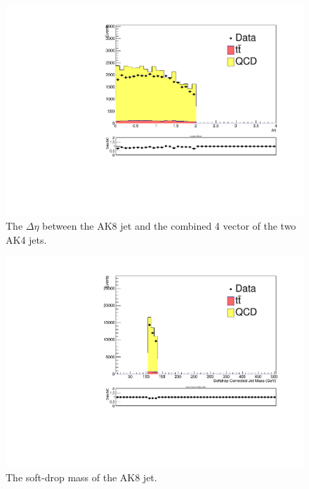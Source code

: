 \begin{figure}[thb!]
\begin{center}
\includegraphics[scale=0.34]{Figures/ratMCdeta.pdf}
\end{center}
\caption{The $\Delta\eta$ between the AK8 jet and the combined 4 vector of the two AK4 jets.}
\label{fig:dMCdeta}
\end{figure} 

\begin{figure}[thb!]
\begin{center}
\includegraphics[scale=0.5]{Figures/ratMCjetmass.pdf}
\end{center}
\caption{The soft-drop mass of the AK8 jet.}
\label{fig:dMCAK8mass}
\end{figure} 

